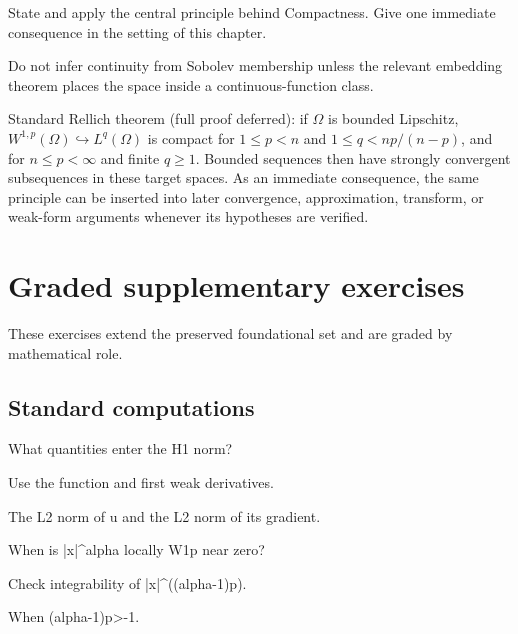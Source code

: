 \begin{exercise}\label{exr:iii21-08}
State and apply the central principle behind Compactness. Give one immediate consequence in the setting of this chapter.
\end{exercise}
\begin{hint}
Do not infer continuity from Sobolev membership unless the relevant embedding theorem places the space inside a continuous-function class.
\end{hint}
\begin{solution}
Standard Rellich theorem (full proof deferred): if $\Omega$ is bounded Lipschitz, $W^{1,p}(\Omega)\hookrightarrow L^q(\Omega)$ is compact for $1\le p<n$ and $1\le q<np/(n-p)$, and for $n\le p<\infty$ and finite $q\ge1$. Bounded sequences then have strongly convergent subsequences in these target spaces. As an immediate consequence, the same principle can be inserted into later convergence, approximation, transform, or weak-form arguments whenever its hypotheses are verified.
\end{solution}


\section{Graded supplementary exercises}
These exercises extend the preserved foundational set and are graded by mathematical role.

\subsection*{Standard computations}

\begin{exercise}[H1 norm]\label{exr:iii21-expand-01}
What quantities enter the H1 norm?
\end{exercise}
\begin{hint}
Use the function and first weak derivatives.
\end{hint}
\begin{solution}
The L2 norm of u and the L2 norm of its gradient.
\end{solution}

\begin{exercise}\label{exr:iii21-expand-02}
When is |x|\textasciicircum{}alpha locally W1p near zero?
\end{exercise}
\begin{hint}
Check integrability of |x|\textasciicircum{}((alpha-1)p).
\end{hint}
\begin{solution}
When (alpha-1)p>-1.
\end{solution}

